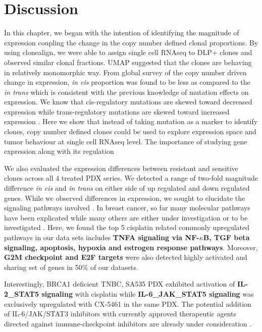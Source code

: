 
\section{Discussion}

In this chapter, we began with the intention of identifying the magnitude of expression coupling the change in the copy number defined clonal proportions. By using clonealign, we were able to assign single cell RNAseq to  DLP+ clones and observed similar clonal fractions. \ac{UMAP} suggested that the clones are behaving in relatively monomorphic way. From global survey of the copy number driven change in expression, \textit{in cis} proportion was found to be less as compared to the \textit{in trans} which is consistent with the previous knowledge of mutation effects on expression. We know that cis-regulatory mutations are skewed toward decreased expression while trans-regulatory mutations are skewed toward increased expression \cite{metzger2016contrasting}. Here we show that instead of taking mutation as a marker to identify clones, copy number defined clones could be used to explore expression  space and tumor behaviour at single cell RNAseq level. The importance of studying gene expression along with its regulation 

We also evaluated the expression differences between resistant and sensitive clones across all 4 treated PDX series. We detected a range of two-fold magnitude difference \textit{in cis} and \textit{in trans} on either side of up regulated and down regulated genes. While we observed differences in expression, we sought to elucidate the signaling pathways involved . In breast cancer, so far many molecular pathways have been explicated while many others are either under investigation or to be investigated \cite{hanahan2011hallmarks}. Here, we found the top 5 cisplatin related commonly upregulated pathways in our data sets includes \textbf{TNFA signaling via NF-$\kappa$B, TGF  beta  signaling, apoptosis, hypoxia and estrogen response pathways}. Moreover, \textbf{G2M checkpoint and E2F targets} were also detected highly activated and sharing set of genes in 50\% of our datasets. 

Interestingly, BRCA1 deficient TNBC, SA535 PDX exhibited activation of \textbf{IL-2\_STAT5 signaling} with cisplatin while \textbf{IL-6\_JAK\_STAT5 signaling} was exclusively upregulated with CX-5461 in the same PDX. The potential addition of IL-6/JAK/STAT3 inhibitors with currently approved therapeutic agents directed against immune-checkpoint inhibitors are already under consideration \cite{johnson2018targeting}.

